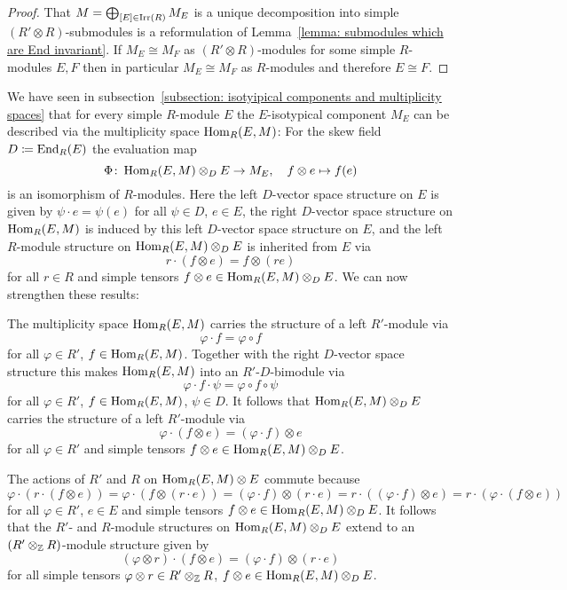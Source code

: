 \begin{proof}
  That $M = \bigoplus_{[E] \in \operatorname{Irr}(R)} M_E$ is a unique decomposition into simple $(R' \otimes R)$-submodules is a reformulation of Lemma~\ref{lemma: submodules which are End invariant}.
  If $M_E \cong M_F$ as $(R' \otimes R)$-modules for some simple $R$-modules $E, F$ then in particular $M_E \cong M_F$ as $R$-modules and therefore $E \cong F$.
\end{proof}




\begin{fluff}
  We have seen in subsection~\ref{subsection: isotyipical components and multiplicity spaces} that for every simple $R$-module $E$ the $E$-isotypical component $M_E$ can be described via the multiplicity space $\operatorname{Hom}_R(E,M)$:
  For the skew field $D \coloneqq \operatorname{End}_R(E)$ the evaluation map
  \[
            \Phi
    \colon  \operatorname{Hom}_R(E, M) \otimes_D E
    \to     M_E,
    \quad   f \otimes e
    \mapsto f(e)
  \]
  is an isomorphism of $R$-modules.
  Here the left $D$-vector space structure on $E$ is given by $\psi \cdot e = \psi(e)$ for all $\psi \in D$, $e \in E$, the right $D$-vector space structure on $\operatorname{Hom}_R(E,M)$ is induced by this left $D$-vector space structure on $E$, and the left $R$-module structure on $\operatorname{Hom}_R(E,M) \otimes_D E$ is inherited from $E$ via
  \[
      r \cdot (f \otimes e)
    = f \otimes (re)
  \]
  for all $r \in R$ and simple tensors $f \otimes e \in \operatorname{Hom}_R(E,M) \otimes_D E$.
  We can now strengthen these results:
  
  The multiplicity space $\operatorname{Hom}_R(E,M)$ carries the structure of a left $R'$-module via
  \[
      \varphi \cdot f
    = \varphi \circ f
  \]
  for all $\varphi \in R'$, $f \in \operatorname{Hom}_R(E,M)$.
  Together with the right $D$-vector space structure this makes $\operatorname{Hom}_R(E,M)$ into an $R'$-$D$-bimodule via
  \[
      \varphi \cdot f \cdot \psi
    = \varphi \circ f \circ \psi
  \]
  for all $\varphi \in R'$, $f \in \operatorname{Hom}_R(E,M)$, $\psi \in D$.
  It follows that $\operatorname{Hom}_R(E,M) \otimes_D E$ carries the structure of a left $R'$-module via
  \[
      \varphi \cdot (f \otimes e)
    = (\varphi \cdot f) \otimes e
  \]
  for all $\varphi \in R'$ and simple tensors $f \otimes e \in \operatorname{Hom}_R(E,M) \otimes_D E$.
  
  The actions of $R'$ and $R$ on $\operatorname{Hom}_R(E, M) \otimes E$ commute because
  \[
      \varphi \cdot (r \cdot (f \otimes e))
    = \varphi \cdot (f \otimes (r \cdot e))
    = (\varphi \cdot f) \otimes (r \cdot e)
    = r \cdot ((\varphi \cdot f) \otimes e)
    = r \cdot (\varphi \cdot (f \otimes e))
  \]
  for all $\varphi \in R'$, $e \in E$ and simple tensors $f \otimes e \in \operatorname{Hom}_R(E,M) \otimes_D E$.
  It follows that the $R'$- and $R$-module structures on $\operatorname{Hom}_R(E,M) \otimes_D E$ extend to an $(R' \otimes_{\mathbb{Z}} R)$-module structure given by
  \[
      (\varphi \otimes r) \cdot (f \otimes e)
    = (\varphi \cdot f) \otimes (r \cdot e)
  \]
  for all simple tensors $\varphi \otimes r \in R' \otimes_{\mathbb{Z}} R$, $f \otimes e \in \operatorname{Hom}_R(E,M) \otimes_D E$.
\end{fluff}


